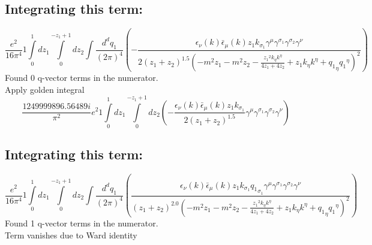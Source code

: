 \subsection*{Integrating this term:}
\begin{dmath}\frac{e^{2}}{16 \pi^{4}}1\int\limits_{ 0 }^{ 1 } d{ z_{ 1 } }\int\limits_{ 0 }^{ - { z_{ 1 } } + 1 } d{ z_{ 2 } }\int\frac{d^d q_1 }{ (2\pi)^4 }\left(- \frac{\epsilon_{ \nu }({ k }) \bar{\epsilon}_{ \mu }({ k }) { z_{ 1 } } { { k }_{ \sigma_1 } } { \gamma^{ \mu } } { \gamma^{ \sigma_1 } } { \gamma^{ \sigma_2 } } { \gamma^{ \nu } }}{2 \left({ z_{ 1 } } + { z_{ 2 } }\right)^{1.5} \left(- m^{2} { z_{ 1 } } - m^{2} { z_{ 2 } } - \frac{{ z_{ 1 } }^{2} { { k }_{ \eta } } { { k }^{ \eta } }}{4 { z_{ 1 } } + 4 { z_{ 2 } }} + { z_{ 1 } } { { k }_{ \eta } } { { k }^{ \eta } } + { { q_1 }_{ \eta } } { { q_1 }^{ \eta } }\right)^{2}}\right)\end{dmath}
Found 0 q-vector terms in the numerator.\\
Apply golden integral
\begin{dmath}\frac{1249999896.56489 i}{\pi^{2}} e^{2}1\int\limits_{ 0 }^{ 1 } d{ z_{ 1 } }\int\limits_{ 0 }^{ - { z_{ 1 } } + 1 } d{ z_{ 2 } }\left(- \frac{\epsilon_{ \nu }({ k }) \bar{\epsilon}_{ \mu }({ k }) { z_{ 1 } } { { k }_{ \sigma_1 } }}{2 \left({ z_{ 1 } } + { z_{ 2 } }\right)^{1.5}} { \gamma^{ \mu } } { \gamma^{ \sigma_1 } } { \gamma^{ \sigma_2 } } { \gamma^{ \nu } }\right)\end{dmath}
\subsection*{Integrating this term:}
\begin{dmath}\frac{e^{2}}{16 \pi^{4}}1\int\limits_{ 0 }^{ 1 } d{ z_{ 1 } }\int\limits_{ 0 }^{ - { z_{ 1 } } + 1 } d{ z_{ 2 } }\int\frac{d^d q_1 }{ (2\pi)^4 }\left(\frac{\epsilon_{ \nu }({ k }) \bar{\epsilon}_{ \mu }({ k }) { z_{ 1 } } { { k }_{ \sigma_1 } } { { q_1 }_{ \sigma_1 } } { \gamma^{ \mu } } { \gamma^{ \sigma_1 } } { \gamma^{ \sigma_2 } } { \gamma^{ \nu } }}{\left({ z_{ 1 } } + { z_{ 2 } }\right)^{2.0} \left(- m^{2} { z_{ 1 } } - m^{2} { z_{ 2 } } - \frac{{ z_{ 1 } }^{2} { { k }_{ \eta } } { { k }^{ \eta } }}{4 { z_{ 1 } } + 4 { z_{ 2 } }} + { z_{ 1 } } { { k }_{ \eta } } { { k }^{ \eta } } + { { q_1 }_{ \eta } } { { q_1 }^{ \eta } }\right)^{2}}\right)\end{dmath}
Found 1 q-vector terms in the numerator.\\
Term vanishes due to Ward identity\\

